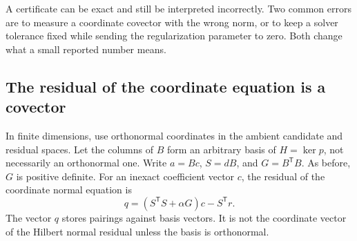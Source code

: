 \label{sec:stopping-rules}
A certificate can be exact and still be interpreted incorrectly. Two common errors are to measure a coordinate covector with the wrong norm, or to keep a solver tolerance fixed while sending the regularization parameter to zero. Both change what a small reported number means.

\subsection{The residual of the coordinate equation is a covector}
In finite dimensions, use orthonormal coordinates in the ambient candidate and residual spaces. Let the columns of $B$ form an arbitrary basis of $H=\ker p$, not necessarily an orthonormal one. Write $a=Bc$, $S=dB$, and $G=B^{\mathsf T}B$. As before, $G$ is positive definite. For an inexact coefficient vector $c$, the residual of the coordinate normal equation is
\[
 q=(S^{\mathsf T}S+\alpha G)c-S^{\mathsf T}r.
\]
The vector $q$ stores pairings against basis vectors. It is not the coordinate vector of the Hilbert normal residual unless the basis is orthonormal.

